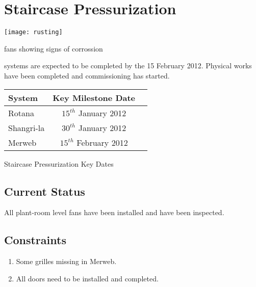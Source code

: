 
\chapter{Staircase Pressurization}



\begin{marginfigure}
  \texttt{[image: rusting]}
  \caption{fans showing signs of corrossion}
  \label{fig:rusting}
\end{marginfigure}

 systems are expected to be completed by the 15 February 2012. Physical works have been completed and commissioning has started.

           \begin{margintable} 
	    \begin{tabular}{lcl}
	      \toprule
	      System    & Key Milestone Date  \\
	      \midrule
                 Rotana      & $15^{th}$  January 2012  \\   
                 Shangri-la  & $30^{th}$ January 2012\\
	     Merweb     &  $15^{th}$  February 2012  \\
     	      \bottomrule
	    \end{tabular}
           \caption{Staircase Pressurization Key Dates}
           \label{tbl:KEkeydates}
            \end{margintable}

\section{Current Status}

All plant-room level fans have been installed and have been
inspected.



\section{Constraints}


\begin{enumerate} 
\item Some grilles missing in Merweb.
\item All doors need to be installed and completed.
\end{enumerate}

